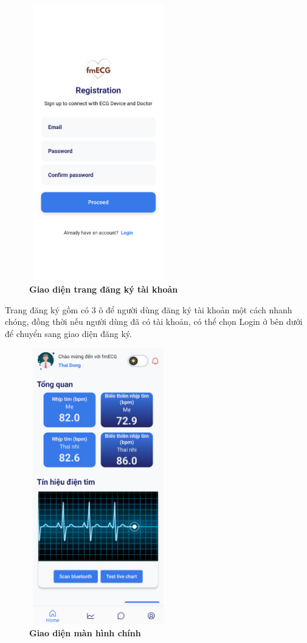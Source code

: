 \begin{figure}[H]
  \centering
  \includegraphics[width=6cm,height=12cm]{Images/mobile_app/demo/register.png}
  \caption[Giao diện trang đăng ký tài khoản]{\bfseries \fontsize{12pt}{0pt}\selectfont Giao diện trang đăng ký tài khoản}
  \label{demo_register} %
\end{figure}

Trang đăng ký gồm có 3 ô để người dùng đăng ký tài khoản một cách nhanh chóng, đồng thời nếu người dùng đã có tài khoản, có thể chọn
Login ở bên dưới để chuyển sang giao diện đăng ký.

\begin{figure}[H]
  \centering
  \includegraphics[width=6cm,height=12cm]{Images/mobile_app/demo/home_screen.png}
  \caption[Giao diện màn hình chính]{\bfseries \fontsize{12pt}{0pt}\selectfont Giao diện màn hình chính}
  \label{demo_home_screen} %
\end{figure}

